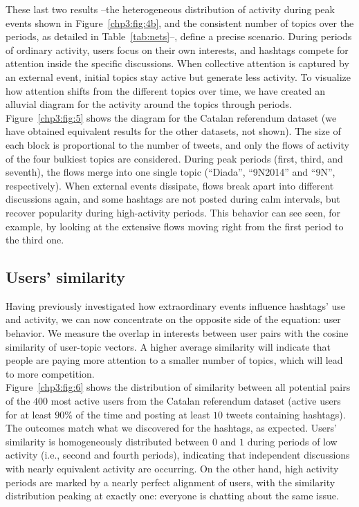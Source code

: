 These last two results --the heterogeneous distribution of activity during peak events shown in Figure~\ref{chp3:fig:4b}, and the consistent number of topics over the periods,  as detailed in Table~\ref{tab:nets}--, define a precise scenario. During periods of ordinary activity, users focus on their own interests, and hashtags compete for attention inside the specific discussions. When collective attention is captured by an external event, initial topics stay active but generate less activity. To visualize how attention shifts from the different topics over time, we have created an alluvial diagram for the activity around the topics through periods. Figure~\ref{chp3:fig:5} shows the diagram for the Catalan referendum dataset (we have obtained equivalent results for the other datasets, not shown). The size of each block is proportional to the number of tweets, and only the flows of activity of the four bulkiest topics are considered. During peak periods (first, third, and seventh), the flows merge into one single topic (``Diada'', ``9N2014'' and ``9N'', respectively). When external events dissipate, flows break apart into different discussions again, and some hashtags are not posted during calm intervals, but recover popularity during high-activity periods. This behavior can see seen, for example, by looking at the extensive flows moving right from the first period to the third one.


\subsection{Users' similarity}
\label{chp3:2.2}

Having previously investigated how extraordinary events influence hashtags' use and activity, we can now concentrate on the opposite side of the equation: user behavior. We measure the overlap in interests between user pairs with the cosine similarity of user-topic vectors. A higher average similarity will indicate that people are paying more attention to a smaller number of topics, which will lead to more competition. \\

Figure~\ref{chp3:fig:6} shows the distribution of similarity between all potential pairs of the $400$ most active users from the Catalan referendum dataset (active users for at least $90\%$ of the time and posting at least $10$ tweets containing hashtags).  The outcomes  match what we discovered for the hashtags, as expected. Users' similarity is homogeneously distributed between $0$ and $1$ during periods of low activity (i.e., second and fourth periods), indicating that independent discussions with nearly equivalent activity are occurring. On the other hand, high activity periods are marked by a nearly perfect alignment of users, with the similarity distribution peaking at exactly one: everyone is chatting about the same issue.

